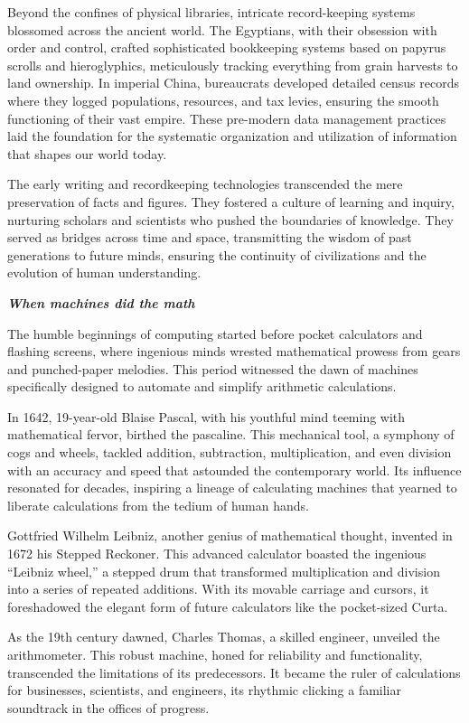 \documentclass[
  letterpaper,
  DIV=11,
  numbers=noendperiod]{scrreprt}
\begin{document}
Beyond the confines of physical libraries, intricate record-keeping
systems blossomed across the ancient world. The Egyptians, with their
obsession with order and control, crafted sophisticated bookkeeping
systems based on papyrus scrolls and hieroglyphics, meticulously
tracking everything from grain harvests to land ownership. In imperial
China, bureaucrats developed detailed census records where they logged
populations, resources, and tax levies, ensuring the smooth functioning
of their vast empire. These pre-modern data management practices laid
the foundation for the systematic organization and utilization of
information that shapes our world today.

The early writing and recordkeeping technologies transcended the mere
preservation of facts and figures. They fostered a culture of learning
and inquiry, nurturing scholars and scientists who pushed the boundaries
of knowledge. They served as bridges across time and space, transmitting
the wisdom of past generations to future minds, ensuring the continuity
of civilizations and the evolution of human understanding.

\textbf{\emph{When machines did the math}}

The humble beginnings of computing started before pocket calculators and
flashing screens, where ingenious minds wrested mathematical prowess
from gears and punched-paper melodies. This period witnessed the dawn of
machines specifically designed to automate and simplify arithmetic
calculations.

In 1642, 19-year-old Blaise Pascal, with his youthful mind teeming with
mathematical fervor, birthed the pascaline. This mechanical tool, a
symphony of cogs and wheels, tackled addition, subtraction,
multiplication, and even division with an accuracy and speed that
astounded the contemporary world. Its influence resonated for decades,
inspiring a lineage of calculating machines that yearned to liberate
calculations from the tedium of human hands.

Gottfried Wilhelm Leibniz, another genius of mathematical thought,
invented in 1672 his Stepped Reckoner. This advanced calculator boasted
the ingenious ``Leibniz wheel,'' a stepped drum that transformed
multiplication and division into a series of repeated additions. With
its movable carriage and cursors, it foreshadowed the elegant form of
future calculators like the pocket-sized Curta.

As the 19th century dawned, Charles Thomas, a skilled engineer, unveiled
the arithmometer. This robust machine, honed for reliability and
functionality, transcended the limitations of its predecessors. It
became the ruler of calculations for businesses, scientists, and
engineers, its rhythmic clicking a familiar soundtrack in the offices of
progress.
\end{document}
